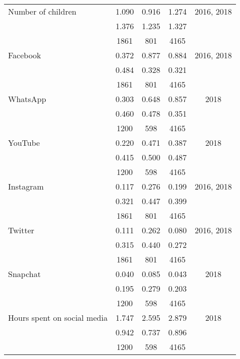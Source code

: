 \begin{table}[H]
{\begin{tabular}{lcccc}
   \hline
Number of children & 1.090 & 0.916 & 1.274 & 2016, 2018 \\ 
   & 1.376 & 1.235 & 1.327 &  \\ 
   & 1861 & 801 & 4165 &  \\ 
   \hline
Facebook & 0.372 & 0.877 & 0.884 & 2016, 2018 \\ 
   & 0.484 & 0.328 & 0.321 &  \\ 
   & 1861 & 801 & 4165 &  \\ 
   \hline
WhatsApp & 0.303 & 0.648 & 0.857 & 2018 \\ 
   & 0.460 & 0.478 & 0.351 &  \\ 
   & 1200 & 598 & 4165 &  \\ 
   \hline
YouTube & 0.220 & 0.471 & 0.387 & 2018 \\ 
   & 0.415 & 0.500 & 0.487 &  \\ 
   & 1200 & 598 & 4165 &  \\ 
   \hline
Instagram & 0.117 & 0.276 & 0.199 & 2016, 2018 \\ 
   & 0.321 & 0.447 & 0.399 &  \\ 
   & 1861 & 801 & 4165 &  \\ 
   \hline
Twitter & 0.111 & 0.262 & 0.080 & 2016, 2018 \\ 
   & 0.315 & 0.440 & 0.272 &  \\ 
   & 1861 & 801 & 4165 &  \\ 
   \hline
Snapchat & 0.040 & 0.085 & 0.043 & 2018 \\ 
   & 0.195 & 0.279 & 0.203 &  \\ 
   & 1200 & 598 & 4165 &  \\ 
   \hline
Hours spent on social media & 1.747 & 2.595 & 2.879 & 2018 \\ 
   & 0.942 & 0.737 & 0.896 &  \\ 
   & 1200 & 598 & 4165 &  \\ 
   \hline
\end{tabular}}
 \end{table}
 
